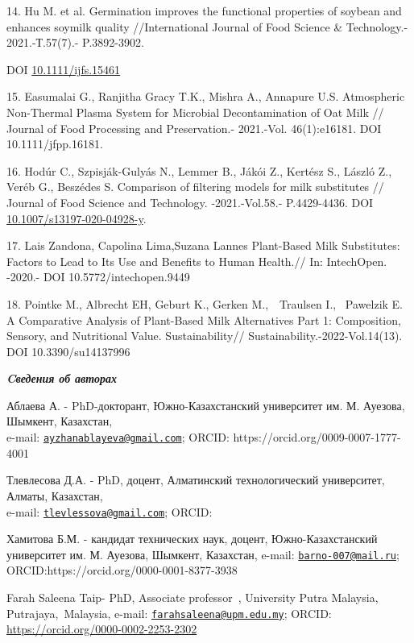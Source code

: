 14. Hu M. et al. Germination improves the functional properties of
soybean and enhances soymilk quality //International Journal of Food
Science \& Technology.- 2021.-Т.57(7).- P.3892-3902.

DOI \href{http://dx.doi.org/10.1111/ijfs.15461}{10.1111/ijfs.15461}

15. Easumalai G., Ranjitha Gracy T.K., Mishra A., Annapure U.S.
Atmospheric Non-Thermal Plasma System for Microbial Decontamination of
Oat Milk // Journal of Food Processing and Preservation.- 2021.-Vol.
46(1):e16181. DOI 10.1111/jfpp.16181.

16. Hodúr C., Szpisják-Gulyás N., Lemmer B., Jákói Z., Kertész S., László
Z., Veréb G., Beszédes S. Comparison of filtering models for milk
substitutes // Journal of Food Science and Technology. -2021.-Vol.58.-
P.4429-4436. DOI
\href{https://doi.org/10.1007/s13197-020-04928-y}{10.1007/s13197-020-04928-y}.

17. Lais Zandona, Capolina Lima,Suzana Lannes Plant-Based Milk
Substitutes: Factors to Lead to Its Use and Benefits to Human Health.//
In: IntechOpen. -2020.- DOI 10.5772/intechopen.9449

18. Pointke M., Albrecht EH, Geburt K., Gerken M.,~~Traulsen I.,~
Pawelzik E. A Comparative Analysis of Plant-Based Milk Alternatives Part
1: Composition, Sensory, and Nutritional Value. Sustainability//
Sustainability.-2022-Vol.14(13). DOI 10.3390/su14137996~

\emph{{\bfseries Cведения об авторах}}

Аблаева А. - PhD-докторант, Южно-Казахстанский университет им. М.
Ауезова, Шымкент, Казахстан,\\
e-mail:
\href{mailto:ayzhanablayeva@gmail.com}{\nolinkurl{ayzhanablayeva@gmail.com}};
ORCID: https://orcid.org/0009-0007-1777-4001

Тлевлесова Д.А. - PhD, доцент, Алматинский технологический университет,
Алматы, Казахстан,\\
e-mail:
\href{mailto:tlevlessova@gmail.com}{\nolinkurl{tlevlessova@gmail.com}};
ORCID:
\href{https://orcid.org/0000-0002-5084-6587}{}

Хамитова Б.М. - кандидат технических наук, доцент, Южно-Казахстанский
университет им. М. Ауезова, Шымкент, Казахстан, e-mail:
\href{mailto:barno-007@mail.ru}{\nolinkurl{barno-007@mail.ru}};
ORCID:https://orcid.org/0000-0001-8377-3938

Farah Saleena Taip- PhD, Associate professor~, University Putra
Malaysia, Putrajaya,~Malaysia, e-mail:
\href{mailto:farahsaleena@upm.edu.my}{\nolinkurl{farahsaleena@upm.edu.my}};
ORCID: \url{https://orcid.org/0000-0002-2253-2302}

